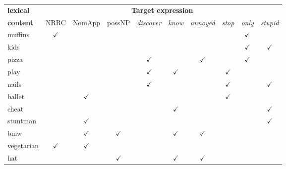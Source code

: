 \documentclass[11pt,fleqn]{article}
\newcommand{\6}{\mbox{$[\hspace*{-.6mm}[$}}
\newcommand{\9}{\mbox{$]\hspace*{-.6mm}]$}}
\begin{document}
\begin{table}[h!]
\begin{center}
\begin{tabular}{l|ccccccccc}
{\bf lexical} & \multicolumn{9}{c}{\bf Target expression} \\ 
 
{\bf content} & NRRC & NomApp & possNP & {\em discover} & {\em know} & {\em annoyed} & {\em stop} & {\em only} & {\em stupid} \\\hline \hline

muffins & $\checkmark$ & & & & & & & $\checkmark$ &  \\

\hline

kids & & & & & & & & $\checkmark$ & $\checkmark$ \\

\hline

pizza & & & & $\checkmark$ & & $\checkmark$ & & $\checkmark$ &  \\

\hline

play & & & & $\checkmark$ & $\checkmark$ & & $\checkmark$ & &  \\

\hline

nails & & & & $\checkmark$ & & & $\checkmark$ & & $\checkmark$  \\

\hline

ballet & & $\checkmark$& & & & & $\checkmark$ & &  \\

\hline

cheat & & & & & $\checkmark$ & & & & $\checkmark$ \\

\hline

stuntman & & $\checkmark$ & & & & & & & $\checkmark$ \\

\hline

bmw & & $\checkmark$ & $\checkmark$ & & $\checkmark$ & $\checkmark$ & & &  \\

\hline

vegetarian & $\checkmark$ & $\checkmark$& & & & & & &  \\

\hline

hat & & & $\checkmark$ & & $\checkmark$ & $\checkmark$ & & &  \\

\hline


\end{tabular}
\end{center}
\end{table}
\end{document}
